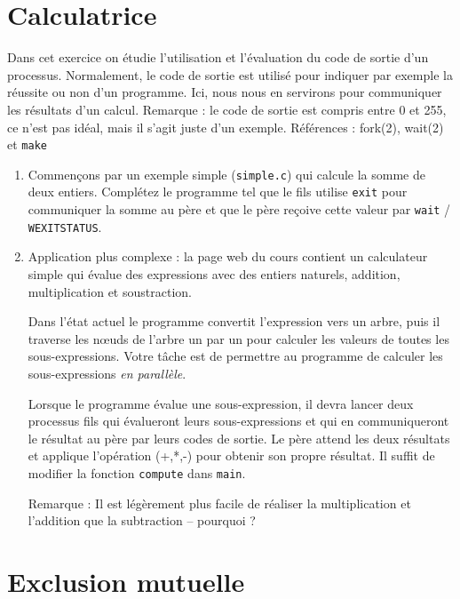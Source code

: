 \documentclass[11pt]{article}
\newcommand{\numtd}{09}
\newcommand{\titretd}{Programmation}
\begin{document}
\entete{\numtd}{\titretd}

\section{Calculatrice}

Dans cet exercice on étudie l'utilisation et l'évaluation du code de sortie d'un processus.
Normalement, le code de sortie est utilisé pour indiquer par exemple la réussite ou non d'un programme.
Ici, nous nous en servirons pour communiquer les résultats d'un calcul.
Remarque : le code de sortie est compris entre 0 et 255, ce n'est pas idéal, mais il s'agit juste d'un exemple.
Références : fork(2), wait(2) et \texttt{make}

\begin{enumerate}
 \item Commençons par un exemple simple (\texttt{simple.c}) qui calcule la somme de deux entiers.
 Complétez le programme tel que le fils utilise \texttt{exit} pour communiquer la somme au père et que le père reçoive cette valeur par \texttt{wait} / \texttt{WEXITSTATUS}.

 \item Application plus complexe : la page web du cours contient un calculateur simple qui évalue des expressions avec des entiers naturels, addition, multiplication et soustraction.

Dans l'état actuel le programme convertit l'expression vers un arbre, puis il traverse les nœuds de l'arbre un par un pour calculer les valeurs de toutes les sous-expressions.
Votre tâche est de permettre au programme de calculer les sous-expressions \emph{en parallèle}.

Lorsque le programme évalue une sous-expression, il devra lancer deux processus fils qui évalueront leurs sous-expressions et qui en communiqueront le résultat au père par leurs codes de sortie.
Le père attend les deux résultats et applique l'opération (+,*,-) pour obtenir son propre résultat.
Il suffit de modifier la fonction \texttt{compute} dans \texttt{main}.

Remarque : Il est légèrement plus facile de réaliser la multiplication et l'addition que la subtraction -- pourquoi ?

\end{enumerate}

\section{Exclusion mutuelle}
\end{document}
